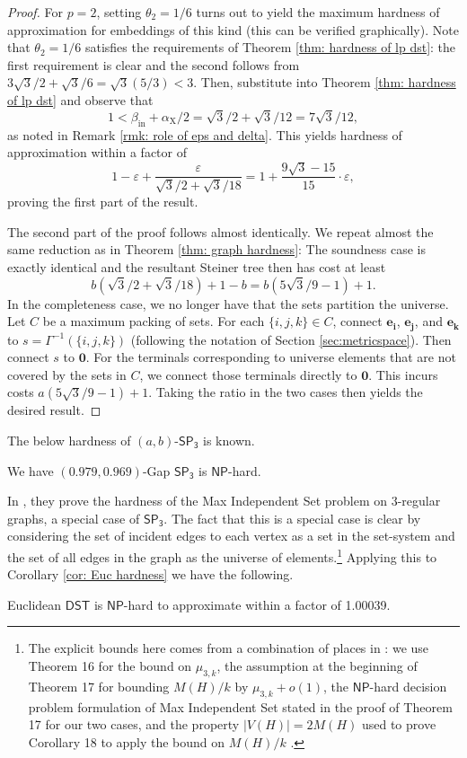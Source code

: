 \documentclass{theoretics}
\newcommand{\1}{\textbf{1}}
\newcommand{\setpT}{$\mathsf{SP_3}$\xspace}
\newcommand{\dst}{$\mathsf{DST}$\xspace}
\newcommand{\np}{$\mathsf{NP}$\xspace}
\newcommand{\srd}{\alpha_{\text{X}}}
\begin{document}
\begin{proof}
For $p = 2$, setting $\theta_2 = 1/6$ turns out to yield the maximum hardness of approximation for embeddings of this kind (this can be verified graphically). Note that $\theta_2 = 1/6$ satisfies the requirements of Theorem \ref{thm: hardness of lp dst}: the first requirement is clear and the second follows from $3\sqrt{3}/2 + \sqrt{3}/6 = \sqrt{3}(5/3) < 3$. Then, substitute into Theorem \ref{thm: hardness of lp dst} and observe that
\[
1 < \beta_{\text{in}} + \srd/2 = \sqrt{3}/2 + \sqrt{3}/12 = 7\sqrt{3}/12,
\]
as noted in Remark \ref{rmk: role of eps and delta}. This yields hardness of approximation within a factor of 
\[
1 - \varepsilon + \frac{\varepsilon}{\sqrt{3}/2 + \sqrt{3}/18} = 1 + \frac{9\sqrt{3} -15}{15} \cdot \varepsilon,
\]
proving the first part of the result.

The second part of the proof follows almost identically. We repeat almost the same reduction as in Theorem \ref{thm: graph hardness}: The soundness case is exactly identical and the resultant Steiner tree then has cost at least 
\[
b(\sqrt{3}/2 + \sqrt{3}/18) + 1 - b = b(5\sqrt{3}/9 -1) + 1.
\]
In the completeness case, we no longer have that the sets partition the universe. Let $C$ be a maximum packing of sets. For each $\{i,j,k\} \in C$, connect $\mathbf{e_i}$, $\mathbf{e_j}$, and $\mathbf{e_k}$ to $s = \Gamma^{-1}(\{i,j,k\})$  (following the notation of Section \ref{sec:metricspace}).  Then connect $s$ to $\mathbf{0}$. For the terminals corresponding to universe elements that are not covered by the sets in $C$, we connect those terminals directly to $\mathbf{0}$. This incurs costs $a(5\sqrt{3}/9 - 1) + 1$. Taking the ratio in the two cases then yields the desired result.
\end{proof}

The below hardness of $(a,b)$-\setpT is known.
\begin{theorem} \label{thm: IS hardness}
We have $(0.979,0.969)$-Gap \setpT is \np-hard.
\end{theorem}
In \cite{Chlebik_Chlebikova_2006}, they prove the hardness of the Max Independent Set problem on $3$-regular graphs, a special case of \setpT. The fact that this is a special case is clear by considering the set of incident edges to each vertex as a set in the set-system and the set of all edges in the graph as the universe of elements.\footnote{The explicit bounds here comes from a combination of places in \cite{Chlebik_Chlebikova_2006}: we use Theorem 16 for the bound on $\mu_{3,k}$, the assumption at the beginning of Theorem 17 for bounding $M(H)/k$ by $\mu_{3, k} + o(1)$, the \np-hard decision problem formulation of Max Independent Set stated in the proof of Theorem 17 for our two cases, and the property $|V(H)| = 2M(H)$ used to prove Corollary 18 to apply the bound on $M(H)/k$ .}
Applying this to Corollary \ref{cor: Euc hardness} we have the following.
\begin{corollary}
Euclidean \dst is \np-hard to approximate within a factor of 1.00039.
\end{corollary}
\end{document}
